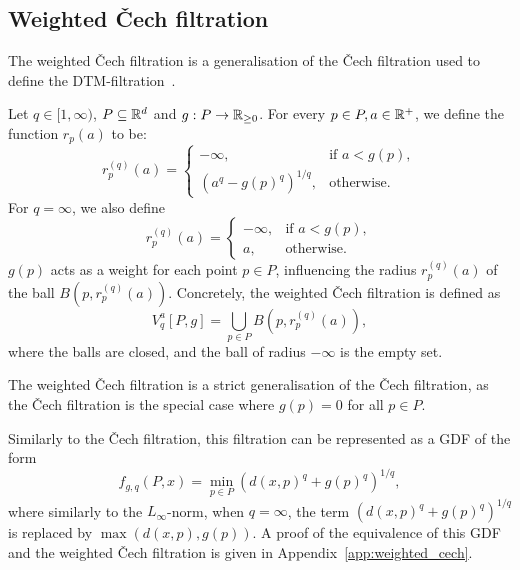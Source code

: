 \subsection{Weighted \v{C}ech filtration}

The weighted \v{C}ech filtration is a generalisation of the \v{C}ech filtration
used to define the DTM-filtration~\cite{anai2020dtm}.

\begin{definition}
    Let $q \in [1, \infty)$, $P \subseteq \mathbb{R}^d$ and
    $g : P \to \mathbb{R}_{\geq 0}$. For every $p \in P, a \in \mathbb{R}^+$, we define the
    function $r_p(a)$ to be:
    \begin{equation}
        r_p^{(q)}(a) = \begin{cases}
            - \infty, & \text{if } a < g(p), \\
            (a^q - g(p)^q)^{1/q}, & \text{otherwise}.
        \end{cases}
    \end{equation}
    For $q = \infty$, we also define
    \begin{equation}
        r_p^{(q)}(a) = \begin{cases}
            - \infty, & \text{if } a < g(p), \\
            a, & \text{otherwise}.
        \end{cases}
    \end{equation}
    $g(p)$ acts as a weight for each point $p \in P$, influencing the radius
    $r_p^{(q)}(a)$ of the ball $B(p, r_p^{(q)}(a))$. Concretely, the weighted
    \v{C}ech filtration is defined as
    \begin{equation}
        V^a_q[P, g] = \bigcup_{p \in P} B(p, r_p^{(q)}(a)),
    \end{equation}
    where the balls are closed, and the ball of radius $-\infty$ is the empty
    set.
\end{definition}
The weighted \v{C}ech filtration is a strict generalisation of the \v{C}ech
filtration, as the \v{C}ech filtration is the special case where $g(p) = 0$ for
all $p \in P$.

Similarly to the \v{C}ech filtration, this filtration can be represented as a
GDF of the form
\begin{equation}
    f_{g, q}(P, x) = \min_{p \in P} (d(x, p)^{q} + g(p)^{q})^{1/q},
\end{equation}
where similarly to the $L_\infty$-norm, when $q = \infty$, the term
$(d(x, p)^q + g(p)^q)^{1/q}$ is replaced by $\max(d(x, p), g(p))$.
A proof of the equivalence of this GDF and the weighted \v{C}ech filtration is
given in Appendix~\ref{app:weighted_cech}.

